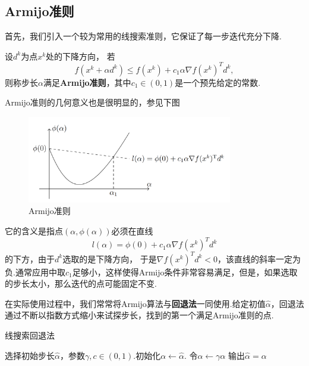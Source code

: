 \subsection{Armijo准则}
首先，我们引入一个较为常用的线搜索准则，它保证了每一步迭代充分下降.
\begin{definition}[Armijo准则]
	设$d^k$为点$x^k$处的下降方向， 若
	\begin{equation*}\label{armijo}
		f(x^k+\alpha d^k)\leq f(x^k)+ c_1\alpha \nabla f(x^k)^Td^k,
	\end{equation*}
	则称步长$\alpha$满足\textbf{Armijo准则}，其中$c_1\in (0, 1)$是一个预先给定的常数.
\end{definition}
Armijo准则的几何意义也是很明显的，参见下图
\begin{figure}[h!]
\caption{Armijo准则}
\centering
\includegraphics[width=0.8\textwidth]{img/armijo.png}
\end{figure}
它的含义是指点$(\alpha, \phi(\alpha))$必须在直线
\begin{equation*}
	l(\alpha) = \phi(0) +c_1\alpha \nabla f(x^k)^Td^k
\end{equation*}
的下方，由于$d^k$选取的是下降方向， 于是$\nabla f(x^k)^Td^k<0$，该直线的斜率一定为负.通常应用中取$c_1$足够小，这样使得Armijo条件非常容易满足，但是，如果选取的步长太小，那么迭代的点可能固定不变.\par
在实际使用过程中，我们常常将Armijo算法与\textbf{回退法}一同使用.给定初值$\hat{\alpha}$，回退法通过不断以指数方式缩小来试探步长，找到的第一个满足Armijo准则的点.
\begin{algorithm}[H]
\caption{线搜索回退法}%
\begin{algorithmic}[1]%
\State 选择初始步长$\hat{\alpha}$，参数$\gamma, c\in (0, 1)$.初始化$\alpha\leftarrow \hat{\alpha}$.
\State 令$\alpha \leftarrow \gamma \alpha$
\EndWhile
\State 输出$\hat{\alpha} = \alpha$
\end{algorithmic}  
\end{algorithm}
